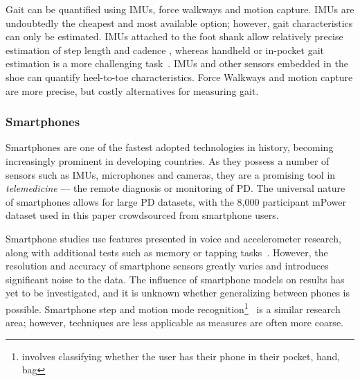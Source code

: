 \documentclass[12pt, twoside]{book}
\renewcommand\emph[1]{\textit{\color{USred}{#1}}}
\begin{document}
Gait can be quantified using IMUs, force walkways and motion capture. IMUs are undoubtedly the cheapest and most available option; however, gait characteristics can only be estimated. IMUs attached to the foot shank allow relatively precise estimation of step length and cadence \cite{barth2011biometric, sijobert2015implementation}, whereas handheld or in-pocket gait estimation is a more challenging task~\cite{renaudin2012step,diaz2014step}. IMUs and other sensors embedded in the shoe can quantify heel-to-toe characteristics. Force Walkways and motion capture are more precise, but costly alternatives for measuring gait.


\subsubsection{Smartphones}
Smartphones are one of the fastest adopted technologies in history, becoming increasingly prominent in developing countries. As they possess a number of sensors such as IMUs, microphones and cameras, they are a promising tool in \textit{telemedicine} --- the remote diagnosis or monitoring of PD. The universal nature of smartphones allows for large PD datasets, with the 8,000 participant mPower~\cite{mpower} dataset used in this paper crowdsourced from smartphone users.

Smartphone studies use features presented in voice and accelerometer research, along with additional tests such as memory or tapping tasks~\cite{tapping}. However, the resolution and accuracy of smartphone sensors greatly varies and introduces significant noise to the data. The influence of smartphone models on results has yet to be investigated, and it is unknown whether generalizing between phones is possible. Smartphone step and motion mode recognition\footnote{\emph{Motion mode recognition} involves classifying whether the user has their phone in their pocket, hand, bag  }~\cite{motionmoderecognition, li2010multimodal} is a similar research area; however, techniques are less applicable as measures are often more coarse.
\end{document}
